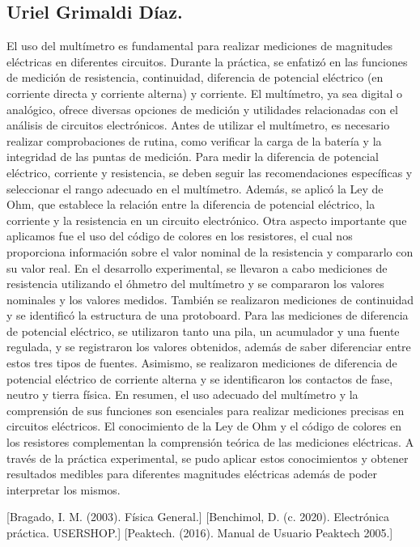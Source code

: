 \documentclass[10pt]{article}
\begin{document}
\begin{multicols}{2}
\subsection*{Uriel Grimaldi Díaz.}
El uso del multímetro es fundamental para realizar mediciones de magnitudes eléctricas en diferentes circuitos. Durante la práctica, se enfatizó en las funciones de medición de resistencia, continuidad, diferencia de potencial eléctrico (en corriente directa y corriente alterna) y corriente. El multímetro, ya sea digital o analógico, ofrece diversas opciones de medición y utilidades relacionadas con el análisis de circuitos electrónicos. Antes de utilizar el multímetro, es necesario realizar comprobaciones de rutina, como verificar la carga de la batería y la integridad de las puntas de medición. 
Para medir la diferencia de potencial eléctrico, corriente y resistencia, se deben seguir las recomendaciones específicas y seleccionar el rango adecuado en el multímetro. Además, se aplicó la Ley de Ohm, que establece la relación entre la diferencia de potencial eléctrico, la corriente y la resistencia en un circuito electrónico. Otra aspecto importante que aplicamos fue el uso del código de colores en los resistores, el cual nos proporciona información sobre el valor nominal de la resistencia y compararlo con su valor real.
En el desarrollo experimental, se llevaron a cabo mediciones de resistencia utilizando el óhmetro del multímetro y se compararon los valores nominales y los valores medidos. También se realizaron mediciones de continuidad y se identificó la estructura de una protoboard. Para las mediciones de diferencia de potencial eléctrico, se utilizaron tanto una pila, un acumulador y una fuente regulada, y se registraron los valores obtenidos, además de saber diferenciar entre estos tres tipos de fuentes. Asimismo, se realizaron mediciones de diferencia de potencial eléctrico de corriente alterna y se identificaron los contactos de fase, neutro y tierra física.
En resumen, el uso adecuado del multímetro y la comprensión de sus funciones son esenciales para realizar mediciones precisas en circuitos eléctricos. El conocimiento de la Ley de Ohm y el código de colores en los resistores complementan la comprensión teórica de las mediciones eléctricas. A través de la práctica experimental, se pudo aplicar estos conocimientos y obtener resultados medibles para diferentes magnitudes eléctricas además de poder interpretar los mismos.
\begin{thebibliography}{0}
	[Bragado, I. M. (2003). Física General.]
	[Benchimol, D. (c. 2020). Electrónica práctica. USERSHOP.]
	[Peaktech. (2016). Manual de Usuario Peaktech 2005.]
		
\end{thebibliography}

\end{multicols}
\end{document}
